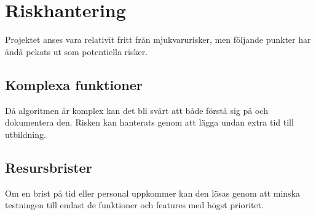 \section{Riskhantering}
Projektet anses vara relativit fritt från mjukvarurisker, men följande punkter har ändå pekats ut som potentiella risker. 
\subsection{Komplexa funktioner}
Då algoritmen är komplex kan det bli svårt att både förstå sig på och dokumentera den. Risken kan hanterats genom att lägga undan extra tid till utbildning.

\subsection{Resursbrister}
Om en brist på tid eller personal uppkommer kan den lösas genom att minska testningen till endast de funktioner och features med högst prioritet.
